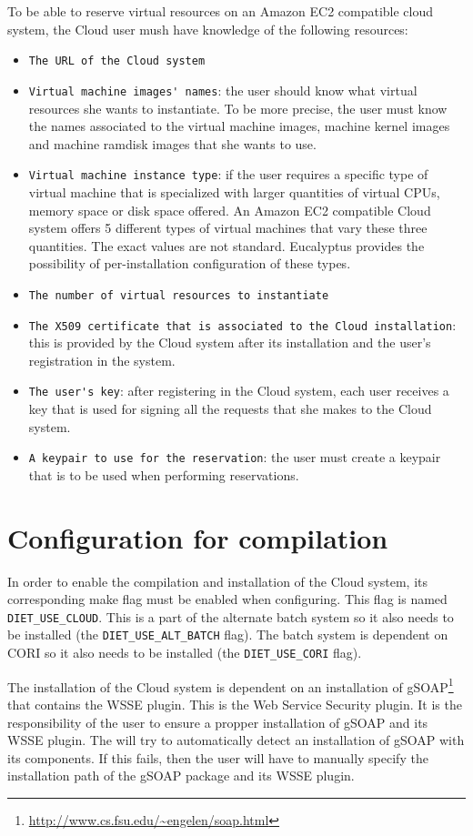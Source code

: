 To be able to reserve virtual resources on an Amazon EC2 compatible cloud system, the Cloud user
mush have knowledge of the following resources:
\begin{itemize}
\item \verb!The URL of the Cloud system!
\item \verb!Virtual machine images' names!: the user should know what virtual resources she wants
to instantiate. To be more precise, the user must know the names associated to the virtual machine
images, machine kernel images and machine ramdisk images that she wants to use.
\item \verb!Virtual machine instance type!: if the user requires a specific type of virtual machine
that is specialized with larger quantities of virtual CPUs, memory space or disk space offered.
An Amazon EC2 compatible Cloud system offers 5 different types of virtual machines that vary these
three quantities. The exact values are not standard. Eucalyptus provides the possibility of
per-installation configuration of these types.
\item \verb!The number of virtual resources to instantiate!
\item \verb!The X509 certificate that is associated to the Cloud installation!: this is provided by
the Cloud system after its installation and the user's registration in the system.
\item \verb!The user's key!: after registering in the Cloud system, each user receives a key
that is used for signing all the requests that she makes to the Cloud system.
\item \verb!A keypair to use for the reservation!: the user must create a keypair that is to be used
when performing reservations.
\end{itemize}


\section{Configuration for compilation}

In order to enable the compilation and installation of the \diet Cloud system, its corresponding make flag
must be enabled when configuring. This flag is named \verb!DIET_USE_CLOUD!. This is a part of
the alternate batch system so it also needs to be installed (the \verb!DIET_USE_ALT_BATCH! flag). The \diet
batch system is dependent on CORI so it also needs to be installed (the \verb!DIET_USE_CORI! flag).

The installation of the Cloud system is dependent on an installation of gSOAP\footnote{\url{http://www.cs.fsu.edu/~engelen/soap.html}}
that contains the WSSE plugin.
This is the Web Service Security plugin. It is the responsibility of the \diet user to ensure a propper
installation of gSOAP and its WSSE plugin. The will try to automatically detect an installation of gSOAP
with its components. If this fails, then the \diet user will have to manually specify the installation
path of the gSOAP package and its WSSE plugin.


